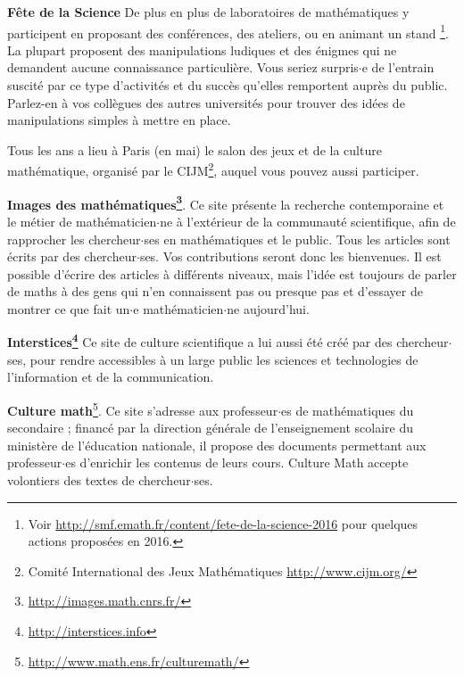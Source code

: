 \medskip\par
{\bf F\^ete de la Science} De plus en plus de laboratoires de math\'ematiques y participent en proposant
des conf\'erences, des ateliers, ou en animant un stand
\footnote{Voir \url{http://smf.emath.fr/content/fete-de-la-science-2016} pour quelques actions propos\'ees en 2016.}.
La plupart proposent des manipulations ludiques et des \'enigmes qui ne demandent aucune connaissance particuli\`ere.
Vous seriez surpris$\cdot$e de l'entrain suscit\'e par ce type d'activit\'es et du succ\`es qu'elles remportent aupr\`es du public.
Parlez-en \`a vos coll\`egues des autres universit\'es pour trouver des id\'ees de manipulations simples \`a mettre en place.

Tous les ans a lieu \`a Paris (en mai) le salon des jeux et de la culture math\'ematique, organis\'e par le CIJM\footnote{Comit\'e International des Jeux Math\'ematiques \url{http://www.cijm.org/}}, auquel vous pouvez aussi participer.

\medskip\par
{\bf Images des math\'ematiques\footnote{\url{http://images.math.cnrs.fr/}}}.
Ce site pr\'esente la recherche contemporaine et le m\'etier de math\'ematicien$\cdot$ne \`a l'ext\'erieur de la communaut\'e
scientifique, afin de rapprocher les chercheur$\cdot$ses en math\'ematiques et le public.
Tous les articles sont \'ecrits par des chercheur$\cdot$ses. Vos contributions seront donc les bienvenues.
Il est possible d'\'ecrire des articles \`a diff\'erents niveaux, mais l'id\'ee est toujours de parler de maths \`a des gens
qui n'en connaissent pas ou presque pas et d'essayer de montrer ce que fait un$\cdot$e math\'ematicien$\cdot$ne aujourd'hui.

\medskip\par
\textbf{Interstices\footnote{\url{http://interstices.info}}}
Ce site de culture scientifique a lui aussi \'et\'e cr\'e\'e par des chercheur$\cdot$ses, pour rendre accessibles \`a un large public
 les sciences et technologies de l'information et de la communication.

\medskip\par
\textbf{Culture math}\footnote{\url{http://www.math.ens.fr/culturemath/}}. Ce site s'adresse aux professeur$\cdot$es
de math\'ematiques du secondaire ; financ\'e par la direction g\'en\'erale de l'enseignement scolaire du minist\`ere de
 l'\'education nationale, il propose des documents permettant aux professeur$\cdot$es d'enrichir les contenus de leurs cours.
Culture Math accepte volontiers des textes de chercheur$\cdot$ses.

